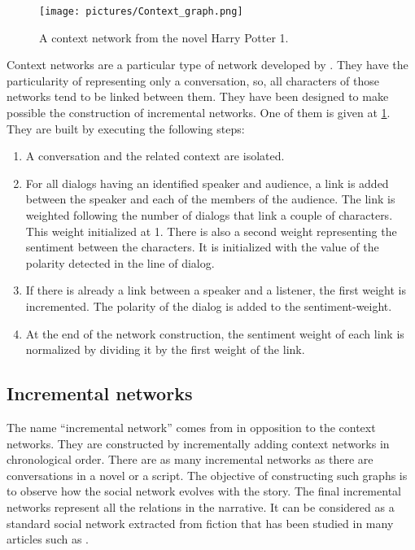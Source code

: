 \documentclass[a4paper, 12pt]{report}
\begin{document}
\begin{figure}[h]
\centering
\texttt{[image: pictures/Context\_graph.png]}
\caption{A context network from the novel Harry Potter 1.}
\label{cn_harry}
\end{figure}

Context networks are a particular type of network developed by \cite{original}. They have the particularity of representing only a conversation, so, all characters of those networks tend to be linked between them. They have been designed to make possible the construction of incremental networks. One of them is given at \ref{cn_harry}. \\

They are built by executing the following steps:
\begin{enumerate}
\item A conversation and the related context are isolated.
\item For all dialogs having an identified speaker and audience, a link is added between the speaker and each of the members of the audience. The link is weighted following the number of dialogs that link a couple of characters. This weight initialized at 1. There is also a second weight representing the sentiment between the characters. It is initialized with the value of the polarity detected in the line of dialog.
\item If there is already a link between a speaker and a listener, the first weight is incremented. The polarity of the dialog is added to the sentiment-weight.
\item At the end of the network construction, the sentiment weight of each link is normalized by dividing it by the first weight of the link.
\end{enumerate}



\subsection{Incremental networks}
The name ``incremental network'' comes from \cite{original} in opposition to the context networks. They are constructed by incrementally adding context networks in chronological order. There are as many incremental networks as there are conversations in a novel or a script. The objective of constructing such graphs is to observe how the social network evolves with the story.
The final incremental networks represent all the relations in the narrative. It can be considered as a standard social network extracted from fiction that has been studied in many articles such as \cite{agarwal-etal-2013-automatic, NER, character_country, movie, fiction, Dekker2018EvaluatingSN}.\\
\end{document}
